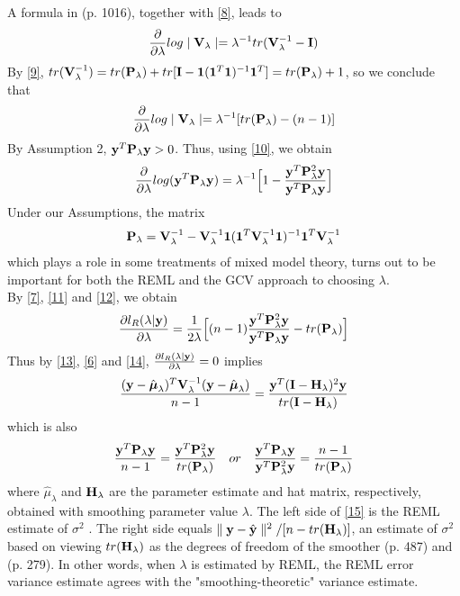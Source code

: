 \documentclass[11pt]{article}
\begin{document}
A formula in \citep{lindstrom_newtonraphson_1988}(p. 1016), together with \eqref{8}, leads to
\begin{align*}
\frac{\partial}{\partial \lambda}log\mid {\bf V}_\lambda \mid=\lambda^{-1}tr({\bf V}_\lambda^{-1}-{\bf I})
\end{align*}
By \eqref{9}, $tr({\bf V}_\lambda^{-1})=tr({\bf P}_\lambda)+tr[{\bf I}-\mathbf{1}(\mathbf{1}^T\mathbf{1})^{-1}\mathbf{1}^T]=tr({\bf P}_\lambda)+1$, so we conclude that
\begin{align}
\frac{\partial}{\partial \lambda}log\mid {\bf V}_\lambda \mid=\lambda^{-1}[tr({\bf P}_\lambda)-(n-1)] \label{11}
\end{align}
By Assumption 2, ${\bf y}^T{\bf P}_\lambda {\bf y}>0$. Thus, using \eqref{10}, we obtain
\begin{align}
\frac{\partial}{\partial \lambda}log({\bf y}^T{\bf P}_\lambda {\bf y})=\lambda^{-1}\Big[1-\frac{{\bf y}^T{\bf P}_\lambda^2{\bf y}}{{\bf y}^T{\bf P}_\lambda {\bf y}} \Big] \label{12}
\end{align}
Under our Assumptions, the matrix
\begin{align*}
{\bf P}_\lambda={\bf V}_\lambda^{-1}-{\bf V}_\lambda^{-1}\mathbf{1}(\mathbf{1}^T{\bf V}_\lambda^{-1}\mathbf{1})^{-1}\mathbf{1}^T{\bf V}_\lambda^{-1}
\end{align*}
which plays a role in some treatments of mixed model theory, turns out to be important for both the REML and the GCV approach to choosing $\lambda$.\\
By \eqref{7}, \eqref{11} and \eqref{12}, we obtain
\begin{align}
\frac{\partial l_R(\lambda|{\bf y})}{\partial \lambda}=\frac{1}{2\lambda}\Big[(n-1)\frac{{\bf y}^T{\bf P}_\lambda^2{\bf y}}{{\bf y}^T{\bf P}_\lambda {\bf y}}- tr({\bf P}_\lambda)\Big] \label{14}
\end{align}
Thus by \eqref{13}, \eqref{6} and \eqref{14}, $\frac{\partial l_R(\lambda|{\bf y})}{\partial \lambda}=0$ implies
\begin{align}
\frac{({\bf y}-\hat{\boldsymbol{\mu}}_\lambda)^T{\bf V}_\lambda^{-1}({\bf y}-\hat{\boldsymbol{\mu}}_\lambda)}{n-1}=\frac{{\bf y}^T ({\bf I}-{\bf H}_\lambda)^2{\bf y}}{tr({\bf I}-{\bf H}_\lambda)} \label{15}
\end{align}
which is also
\begin{align}
\frac{{\bf y}^T{\bf P}_\lambda {\bf y}}{n-1}=\frac{{\bf y}^T {\bf P}_\lambda^2{\bf y}}{tr({\bf P}_\lambda)} \quad or\quad \frac{{\bf y}^T{\bf P}_\lambda {\bf y}}{{\bf y}^T {\bf P}_\lambda^2{\bf y}}=\frac{n-1}{tr({\bf P}_\lambda)}
\end{align}
where $\hat{\mu}_\lambda$ and ${\bf H}_\lambda$ are the parameter estimate and hat matrix, respectively, obtained with smoothing parameter value $\lambda$. The left side of \eqref{15} is the REML estimate of $\sigma^2$ \citep{wahba_spline_1990}. The right side equals $\parallel {\bf y}-\hat{{\bf y}}\parallel ^2/[n-tr({\bf H}_\lambda)]$, an estimate of $\sigma^2$ based on viewing $tr({\bf H}_\lambda)$ as the degrees of freedom of the smoother \citep{pawitan_all_2001}(p. 487) and \citep{lee_generalized_2006}(p. 279). In other words, when $\lambda$ is estimated by REML, the REML error variance estimate agrees with the "smoothing-theoretic" variance estimate.
\end{document}
